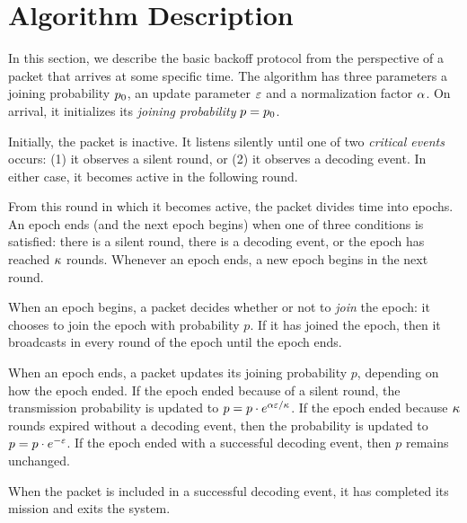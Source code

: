 \section{Algorithm Description}
\label{sec:algorithm}

In this section, we describe the basic backoff protocol from the perspective of a packet that arrives at some specific time. The algorithm has three parameters a joining probability $p_0$, an update parameter $\varepsilon$ and a normalization factor $\alpha$. On arrival, it initializes its \emph{joining probability} $p = p_0$.

Initially, the packet is inactive.  It listens silently until one of two \emph{critical events} occurs: (1) it observes a silent round, or (2) it observes a decoding event.  In either case, it becomes active in the following round.

From this round in which it becomes active, the packet divides time into epochs.  An epoch ends (and the next epoch begins) when one of three conditions is satisfied: there is a silent round, there is a decoding event, or the epoch has reached $\kappa$ rounds.  Whenever an epoch ends, a new epoch begins in the next round.

When an epoch begins, a packet decides whether or not to \emph{join} the epoch: it chooses to join the epoch with probability $p$.  If it has joined the epoch, then it broadcasts in every round of the epoch until the epoch ends.

When an epoch ends, a packet updates its joining probability $p$, depending on how the epoch ended.  If the epoch ended because of a silent round, the transmission probability is updated to $p=p\cdot e^{\alpha\varepsilon/\kappa}$. %
 If the epoch ended because $\kappa$ rounds expired without a decoding event, then the probability is updated to $p=p\cdot e^{-\varepsilon}$. %
 If the epoch ended with a successful decoding event, then $p$ remains unchanged.

When the packet is included in a successful decoding event, it has completed its mission and exits the system.

